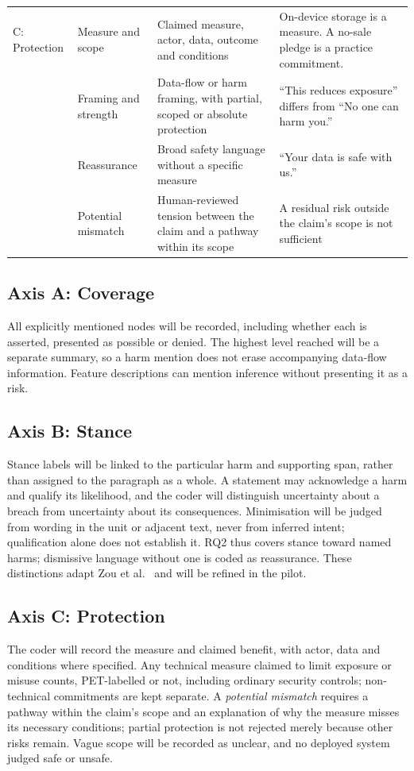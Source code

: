 \begin{table}[t]
\begin{singlespace}
\begin{tabularx}{\textwidth}{@{}L{1.6cm}L{2.8cm}>{\raggedright\arraybackslash}X>{\raggedright\arraybackslash}X@{}}
\midrule
C: Protection & Measure and scope & Claimed measure, actor, data, outcome and conditions
  & On-device storage is a measure. A no-sale pledge is a practice commitment. \\
\rowrule
 & Framing and strength & Data-flow or harm framing, with partial, scoped or absolute protection
  & \enquote{This reduces exposure} differs from \enquote{No one can harm you.} \\
\rowrule
 & Reassurance & Broad safety language without a specific measure
  & \enquote{Your data is safe with us.} \\
\rowrule
 & Potential mismatch & Human-reviewed tension between the claim and a pathway within its scope
  & A residual risk outside the claim's scope is not sufficient \\
\bottomrule
\end{tabularx}
\end{singlespace}
\end{table}

\subsection{Axis A: Coverage} All explicitly mentioned nodes will be
recorded, including whether each is asserted, presented as possible or denied.
The highest level reached will be a separate summary, so a harm
mention does not erase accompanying data-flow information. Feature descriptions can mention inference without presenting it as a risk.

\subsection{Axis B: Stance} Stance labels will be linked to the
particular harm and supporting span, rather than assigned to the paragraph
as a whole. A statement may acknowledge a harm and qualify its likelihood,
and the coder will distinguish uncertainty about a breach from uncertainty
about its consequences. Minimisation will be judged from wording in the unit
or adjacent text, never from inferred intent; qualification alone does not
establish it. RQ2 thus covers stance toward named harms; dismissive language
without one is coded as reassurance. These distinctions adapt Zou et
al.~\parencite{zou2019might} and will be refined in the pilot.

\subsection{Axis C: Protection} The coder will record the measure
and claimed benefit, with actor, data and conditions where specified. Any
technical measure claimed to limit exposure or misuse counts, PET-labelled or
not, including ordinary security controls; non-technical commitments are kept
separate. A \emph{potential mismatch} requires a pathway within the claim's
scope and an explanation of why the measure misses its necessary conditions;
partial protection is not rejected merely because other risks remain. Vague
scope will be recorded as unclear, and no deployed system judged safe or
unsafe.


